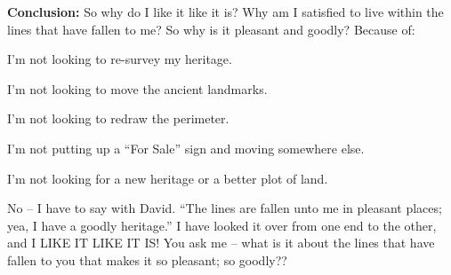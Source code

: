 \noindent \textbf{Conclusion:} So why do I like it like it is?  Why am I satisfied to live within the lines that have fallen to me?
So why is it pleasant and goodly?
Because of:\\
\begin{compactenum}[1.]
    \item I’m not looking to re-survey my heritage.
    \item I’m not looking to move the ancient landmarks.
    \item I’m not looking to redraw the perimeter.
    \item I’m not putting up a “For Sale” sign and moving somewhere else.
    \item I’m not looking for a new heritage or a better plot of land.\\
\end{compactenum}
No – I have to say with David. “The lines are fallen unto me in pleasant places; yea, I have a goodly heritage.”  I have looked it over from one end to the other, and I LIKE IT LIKE IT IS!
You ask me – what is it about the lines that have fallen to you that makes it so pleasant; so goodly??\\
